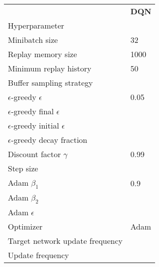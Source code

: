 \begin{tabular}{ll}
 & \bfseries DQN \\
Hyperparameter &  \\
Minibatch size & 32 \\
Replay memory size & 1000 \\
Minimum replay history & 50 \\
Buffer sampling strategy &  \\
$\epsilon$-greedy $\epsilon$ & 0.05 \\
$\epsilon$-greedy final $\epsilon$ &  \\
$\epsilon$-greedy initial $\epsilon$ &  \\
$\epsilon$-greedy decay fraction &  \\
Discount factor $\gamma$ & 0.99 \\
Step size &  \\
Adam $\beta_1$ & 0.9 \\
Adam $\beta_2$ &  \\
Adam $\epsilon$ &  \\
Optimizer & Adam \\
Target network update frequency &  \\
Update frequency &  \\
\end{tabular}
